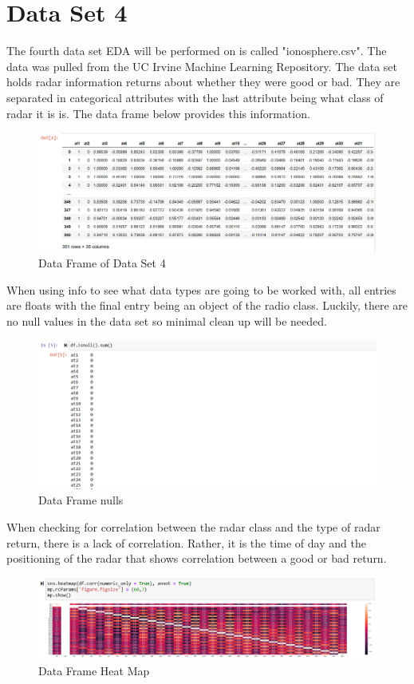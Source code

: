 \documentclass{article}
\begin{document}
\section{Data Set 4}
The fourth data set EDA will be performed on is called "ionosphere.csv". 
The data was pulled from the UC Irvine Machine Learning Repository. The data set holds radar information returns about whether they were good or bad. They are separated in categorical attributes with the last attribute being what class of radar it is is. The data frame below provides this information.
\begin{figure}
    \centering
    \includegraphics[width=0.5\linewidth]{33.png}
    \caption{Data Frame of Data Set 4}
    \label{fig:enter-label}
\end{figure}
When using info to see what data types are going to be worked with, all entries are floats with the final entry being an object of the radio class.
Luckily, there are no null values in the data set so minimal clean up will be needed. 
\begin{figure}
    \centering
    \includegraphics[width=0.5\linewidth]{22.png}
    \caption{Data Frame nulls}
    \label{fig:enter-label}
\end{figure}
When checking for correlation between the radar class and the type of radar return, there is a lack of correlation. Rather, it is the time of day and the positioning of the radar that shows correlation between a good or bad return.
\begin{figure}
    \centering
    \includegraphics[width=0.5\linewidth]{11.png}
    \caption{Data Frame Heat Map}
    \label{fig:enter-label}
\end{figure}
\end{document}
